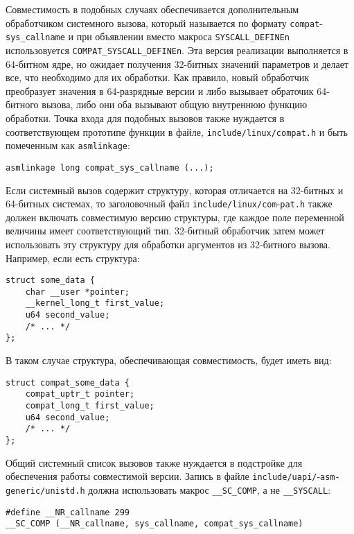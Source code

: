 Совместимость в подобных случаях обеспечивается дополнительным обработчиком
системного вызова, который называется по формату \texttt{compat}-\texttt{sys\_callname} и
при объявлении вместо макроса \texttt{SYSCALL\_DEFINEn} использовуется
\texttt{COMPAT\_SYSCALL\_DEFINEn}.
Эта версия реализации выполняется в 64-битном ядре,
но ожидает получения 32-битных значений параметров и делает все, что необходимо
для их обработки. Как правило, новый обработчик преобразует значения в
64-разрядные версии и либо вызывает обраточик 64-битного вызова, либо они оба
вызывают общую внутреннюю функцию обработки. Точка входа для подобных вызовов
также нуждается в соответствующем прототипе функции в файле,
\texttt{include/linux/compat.h} и быть помеченным как \texttt{asmlinkage}:

\medskip
\begin{lstlisting}[style=cstyle]
asmlinkage long compat_sys_callname (...);
\end{lstlisting}
\medskip

Если системный вызов содержит структуру, которая отличается на 32-битных и
64-битных системах, то заголовочный файл \texttt{include/linux/com}-\texttt{pat.h} также
должен включать совместимую версию структуры, где каждое поле переменной
величины имеет соответствующий тип. 32-битный обработчик затем может
использовать эту структуру для обработки аргументов из 32-битного вызова.
Например, если есть структура:

\medskip
\begin{lstlisting}[style=cstyle]
struct some_data {
	char __user *pointer;
	__kernel_long_t first_value;
	u64 second_value;
	/* ... */
};
\end{lstlisting}
\medskip

В таком случае структура, обеспечивающая совместимость, будет иметь вид:

\medskip
\begin{lstlisting}[style=cstyle]
struct compat_some_data {
	compat_uptr_t pointer;
	compat_long_t first_value;
	u64 second_value;
	/* ... */
};
\end{lstlisting}
\medskip

Общий системный список вызовов также нуждается в подстройке для обеспечения
работы совместимой версии. Запись в файле \texttt{include/uapi/}-\texttt{asm-generic/unistd.h}
должна использовать макрос \texttt{\_\_SC\_COMP}, а не \texttt{\_\_SYSCALL}:

\medskip
\begin{lstlisting}[style=cstyle]
#define __NR_callname 299
__SC_COMP (__NR_callname, sys_callname, compat_sys_callname)
\end{lstlisting}
\medskip

